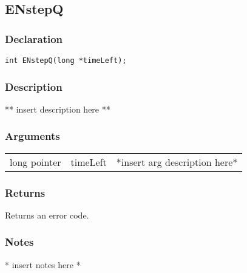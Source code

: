 \subsection{ENstepQ}
\subsubsection{Declaration}
\begin{lstlisting}
int ENstepQ(long *timeLeft);
\end{lstlisting}
\subsubsection{Description}
** insert description here **
\subsubsection{Arguments}
\begin{tabular}{l r p{11cm} }
long pointer&timeLeft&*insert arg description here* \\[6pt]
\end{tabular}
\subsubsection{Returns}
Returns an error code.
\subsubsection{Notes}
* insert notes here *